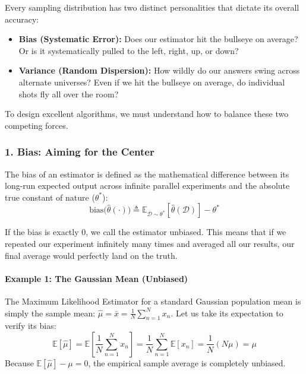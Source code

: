 \documentclass{article}
\begin{document}
Every sampling distribution has two distinct personalities that dictate its overall accuracy:
\begin{itemize}
    \item \textbf{Bias (Systematic Error):} Does our estimator hit the bullseye on average? Or is it systematically pulled to the left, right, up, or down?
    \item \textbf{Variance (Random Dispersion):} How wildly do our answers swing across alternate universes? Even if we hit the bullseye on average, do individual shots fly all over the room?
\end{itemize}



To design excellent algorithms, we must understand how to balance these two competing forces.

\subsubsection{1. Bias: Aiming for the Center}
The bias of an estimator is defined as the mathematical difference between its long-run expected output across infinite parallel experiments and the absolute true constant of nature ($\theta^*$):
\begin{equation}
\text{bias}\big(\hat{\theta}(\cdot)\big) \triangleq \mathbb{E}_{\mathcal{D} \sim \theta^*} \left[ \hat{\theta}(\mathcal{D}) \right] - \theta^*
\end{equation}

If the bias is exactly $0$, we call the estimator unbiased. This means that if we repeated our experiment infinitely many times and averaged all our results, our final average would perfectly land on the truth.

\paragraph{Example 1: The Gaussian Mean (Unbiased)}
The Maximum Likelihood Estimator for a standard Gaussian population mean is simply the sample mean: $\hat{\mu} = \bar{x} = \frac{1}{N}\sum_{n=1}^N x_n$. Let us take its expectation to verify its bias:
\begin{equation}
\mathbb{E}[\hat{\mu}] = \mathbb{E}\left[ \frac{1}{N}\sum_{n=1}^{N} x_n \right] = \frac{1}{N}\sum_{n=1}^{N} \mathbb{E}[x_n] = \frac{1}{N} (N\mu) = \mu
\end{equation}
Because $\mathbb{E}[\hat{\mu}] - \mu = 0$, the empirical sample average is completely unbiased.
\end{document}
